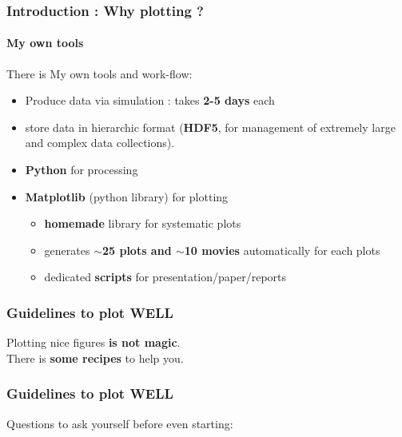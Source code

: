\documentclass[sans, aspectratio=169]{beamer}
\begin{document}
\begin{frame} 
	\frametitle{Introduction : Why plotting ?} 
	\framesubtitle{ My own tools }
	
	There is My own tools and work-flow:
	\begin{itemize}
	\item Produce data via simulation : takes \textbf{2-5 days} each
	\item store data in hierarchic format (\textbf{HDF5}, for management of extremely large and complex data collections).
	\item \textbf{Python} for processing
	\item \textbf{Matplotlib} (python library) for plotting
	\begin{itemize}
		\item \textbf{homemade} library for systematic plots
		\item generates \textbf{$\sim$25 plots and $\sim$10 movies} automatically for each plots
		\item dedicated \textbf{scripts} for presentation/paper/reports
	\end{itemize}
	\end{itemize}
	
\end{frame}


\begin{frame} 
	\frametitle{Guidelines to plot {\bf WELL}} 

		\begin{center}
		Plotting nice figures \textbf{is not magic}.\\
		\vspace{1cm}
		There is \textbf{some recipes} to help you.
		\end{center}

\end{frame}


\begin{frame} 
	\frametitle{Guidelines to plot {\bf WELL}} 

		\begin{center}
		Questions to ask yourself before even starting:\\
	\vspace{0.5cm}
		
		\end{center}
	
\end{frame}
\end{document}
